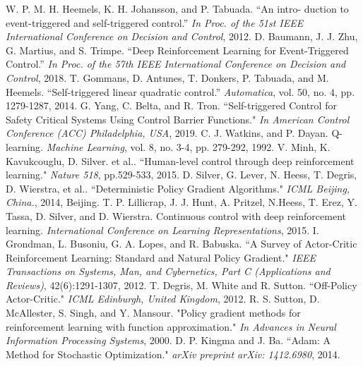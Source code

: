 \documentclass[english, dvipdfmx]{ampmt}             %
\begin{document}
\begin{thebibliography}{20}
W. P. M. H. Heemels, K. H. Johansson, and P. Tabuada. “An intro- duction to event-triggered and self-triggered control.” \textit{In Proc. of the 51st IEEE International Conference on Decision and Control}, 2012.
D. Baumann, J. J. Zhu, G. Martius, and S. Trimpe. “Deep Reinforcement Learning for Event-Triggered Control.”  \textit{In Proc. of the 57th IEEE International Conference on Decision and Control}, 2018.
T. Gommans, D. Antunes, T. Donkers, P. Tabuada, and M. Heemels. “Self-triggered linear quadratic control.” \textit{Automatica}, vol. 50, no. 4, pp. 1279-1287, 2014.
G. Yang, C. Belta, and R. Tron. “Self-triggered Control for Safety Critical Systems Using Control Barrier Functions."  \textit{In American Control Conference (ACC) Philadelphia, USA}, 2019.
C. J. Watkins, and P. Dayan. Q-learning. \textit{Machine Learning}, vol. 8, no. 3-4, pp. 279-292, 1992.
V. Minh, K. Kavukcouglu, D. Silver. et al.. “Human-level control through deep reinforcement learning." \textit{Nature 518}, pp.529-533, 2015.
D. Silver, G. Lever, N. Heess, T. Degris, D. Wierstra, et al.. “Deterministic Policy Gradient Algorithms." \textit{ICML Beijing, China.}, 2014, Beijing.
T. P. Lillicrap, J. J. Hunt, A. Pritzel, N.Heess, T. Erez, Y. Tassa, D. Silver, and D. Wierstra. Continuous control with deep reinforcement learning. \textit{International Conference on Learning Representations}, 2015.
I. Grondman, L. Busoniu, G. A. Lopes, and R. Babuska. “A Survey of Actor-Critic Reinforcement Learning: Standard and Natural Policy Gradient." \textit{IEEE Transactions on Systems, Man, and Cybernetics, Part C (Applications and Reviews)}, 42(6):1291-1307, 2012.
T. Degris, M. White and R. Sutton. “Off-Policy Actor-Critic." \textit{ICML Edinburgh, United Kingdom}, 2012.
R. S. Sutton, D. McAllester, S. Singh, and Y. Mansour. "Policy gradient methods for reinforcement learning with function approximation." \textit{In Advances in Neural Information Processing Systems}, 2000.
D. P. Kingma and J. Ba. “Adam: A Method for Stochastic Optimization." \textit{arXiv preprint arXiv: 1412.6980}, 2014.

\end{thebibliography}
\end{document}
